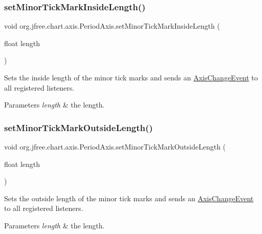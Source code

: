 \subsubsection{\texorpdfstring{set\+Minor\+Tick\+Mark\+Inside\+Length()}{setMinorTickMarkInsideLength()}}
{\footnotesize\ttfamily void org.\+jfree.\+chart.\+axis.\+Period\+Axis.\+set\+Minor\+Tick\+Mark\+Inside\+Length (\begin{DoxyParamCaption}\item[{float}]{length }\end{DoxyParamCaption})}

Sets the inside length of the minor tick marks and sends an \mbox{\hyperlink{}{Axis\+Change\+Event}} to all registered listeners.


\begin{DoxyParams}{Parameters}
{\em length} & the length. \\
\hline
\end{DoxyParams}
\mbox{\label{classorg_1_1jfree_1_1chart_1_1axis_1_1_period_axis_a196d47bde6bc406c52e7a3a5f84e341f}} 
\subsubsection{\texorpdfstring{set\+Minor\+Tick\+Mark\+Outside\+Length()}{setMinorTickMarkOutsideLength()}}
{\footnotesize\ttfamily void org.\+jfree.\+chart.\+axis.\+Period\+Axis.\+set\+Minor\+Tick\+Mark\+Outside\+Length (\begin{DoxyParamCaption}\item[{float}]{length }\end{DoxyParamCaption})}

Sets the outside length of the minor tick marks and sends an \mbox{\hyperlink{}{Axis\+Change\+Event}} to all registered listeners.


\begin{DoxyParams}{Parameters}
{\em length} & the length. \\
\hline
\end{DoxyParams}
\mbox{\label{classorg_1_1jfree_1_1chart_1_1axis_1_1_period_axis_aa8237a585dbae1cc850698c9053b76ef}} 
